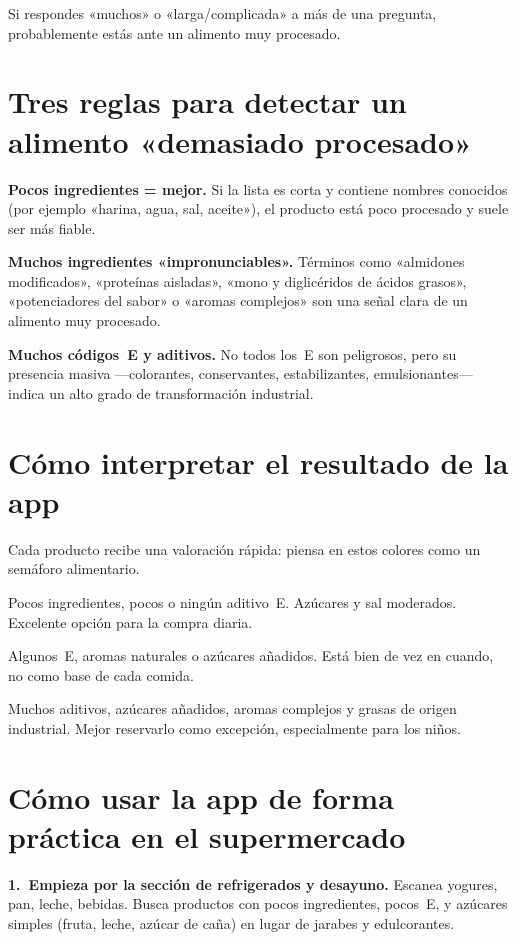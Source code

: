 \documentclass[a5paper,12pt,oneside,openany]{book}
\newcommand{\boxverde}[2]{%
  \begin{tcolorbox}[cajabase,
    colback=verdescuro!8!white, colframe=verdescuro, title={#1}]
  #2\end{tcolorbox}}
\newcommand{\boxamarillo}[2]{%
  \begin{tcolorbox}[cajabase,
    colback=amarillo!12!white, colframe=amarillo!80!black, title={#1}]
  #2\end{tcolorbox}}
\newcommand{\boxrojo}[2]{%
  \begin{tcolorbox}[cajabase,
    colback=rojo!8!white, colframe=rojo, title={#1}]
  #2\end{tcolorbox}}
\begin{document}
Si respondes «muchos» o «larga/complicada» a más de una pregunta, probablemente
estás ante un alimento muy procesado.

\section{Tres reglas para detectar un alimento «demasiado procesado»}

\textbf{Pocos ingredientes = mejor.} Si la lista es corta y contiene nombres
conocidos (por ejemplo «harina, agua, sal, aceite»), el producto está poco
procesado y suele ser más fiable.

\textbf{Muchos ingredientes «impronunciables».} Términos como «almidones
modificados», «proteínas aisladas», «mono y diglicéridos de ácidos grasos»,
«potenciadores del sabor» o «aromas complejos» son una señal clara de un alimento
muy procesado.

\textbf{Muchos códigos~E y aditivos.} No todos los~E son peligrosos, pero su
presencia masiva ---colorantes, conservantes, estabilizantes, emulsionantes---
indica un alto grado de transformación industrial.

\section{Cómo interpretar el resultado de la app}

Cada producto recibe una valoración rápida: piensa en estos colores como un
semáforo alimentario.

\boxverde{Poco procesado --- luz verde}{Pocos ingredientes, pocos o ningún
aditivo~E. Azúcares y sal moderados. Excelente opción para la compra diaria.}

\boxamarillo{Moderadamente procesado --- con moderación}{Algunos~E, aromas
naturales o azúcares añadidos. Está bien de vez en cuando, no como base de
cada comida.}

\boxrojo{Ultraprocesado --- limita o evita}{Muchos aditivos, azúcares añadidos,
aromas complejos y grasas de origen industrial. Mejor reservarlo como excepción,
especialmente para los niños.}

\section{Cómo usar la app de forma práctica en el supermercado}

\textbf{1.~Empieza por la sección de refrigerados y desayuno.} Escanea yogures,
pan, leche, bebidas. Busca productos con pocos ingredientes, pocos~E, y azúcares
simples (fruta, leche, azúcar de caña) en lugar de jarabes y edulcorantes.
\end{document}
